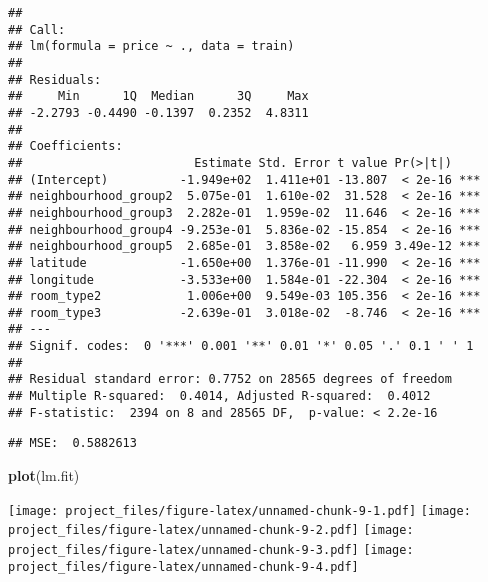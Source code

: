 \documentclass[
]{article}
\newenvironment{Shaded}{\begin{snugshade}}{\end{snugshade}}
\newcommand{\DecValTok}[1]{\textcolor[rgb]{0.00,0.00,0.81}{#1}}
\newcommand{\KeywordTok}[1]{\textcolor[rgb]{0.13,0.29,0.53}{\textbf{#1}}}
\newcommand{\NormalTok}[1]{#1}
\newcommand{\OperatorTok}[1]{\textcolor[rgb]{0.81,0.36,0.00}{\textbf{#1}}}
\newcommand{\StringTok}[1]{\textcolor[rgb]{0.31,0.60,0.02}{#1}}
\begin{document}
\begin{verbatim}
## 
## Call:
## lm(formula = price ~ ., data = train)
## 
## Residuals:
##     Min      1Q  Median      3Q     Max 
## -2.2793 -0.4490 -0.1397  0.2352  4.8311 
## 
## Coefficients:
##                        Estimate Std. Error t value Pr(>|t|)    
## (Intercept)          -1.949e+02  1.411e+01 -13.807  < 2e-16 ***
## neighbourhood_group2  5.075e-01  1.610e-02  31.528  < 2e-16 ***
## neighbourhood_group3  2.282e-01  1.959e-02  11.646  < 2e-16 ***
## neighbourhood_group4 -9.253e-01  5.836e-02 -15.854  < 2e-16 ***
## neighbourhood_group5  2.685e-01  3.858e-02   6.959 3.49e-12 ***
## latitude             -1.650e+00  1.376e-01 -11.990  < 2e-16 ***
## longitude            -3.533e+00  1.584e-01 -22.304  < 2e-16 ***
## room_type2            1.006e+00  9.549e-03 105.356  < 2e-16 ***
## room_type3           -2.639e-01  3.018e-02  -8.746  < 2e-16 ***
## ---
## Signif. codes:  0 '***' 0.001 '**' 0.01 '*' 0.05 '.' 0.1 ' ' 1
## 
## Residual standard error: 0.7752 on 28565 degrees of freedom
## Multiple R-squared:  0.4014, Adjusted R-squared:  0.4012 
## F-statistic:  2394 on 8 and 28565 DF,  p-value: < 2.2e-16
\end{verbatim}

\begin{Shaded}
\end{Shaded}

\begin{verbatim}
## MSE:  0.5882613
\end{verbatim}

\begin{Shaded}
\begin{Highlighting}[]
\KeywordTok{plot}\NormalTok{(lm.fit)}
\end{Highlighting}
\end{Shaded}

\texttt{[image: project\_files/figure-latex/unnamed-chunk-9-1.pdf]}
\texttt{[image: project\_files/figure-latex/unnamed-chunk-9-2.pdf]}
\texttt{[image: project\_files/figure-latex/unnamed-chunk-9-3.pdf]}
\texttt{[image: project\_files/figure-latex/unnamed-chunk-9-4.pdf]}
\end{document}
